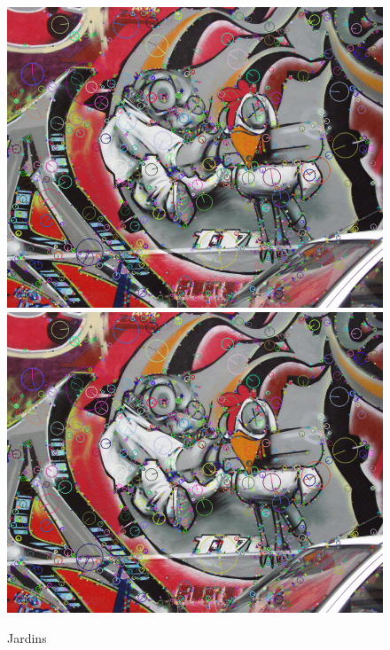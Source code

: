 		\begin{figure}[!htb]
				\includegraphics[width=\linewidth]{images/RobotKp}
				\label{fig:awesome_image1}
			\endminipage\hfill
				\includegraphics[width=\linewidth]{images/RobotKp}
				\label{fig:awesome_image2}
			\endminipage
			\caption{Jardins}
		\end{figure}
